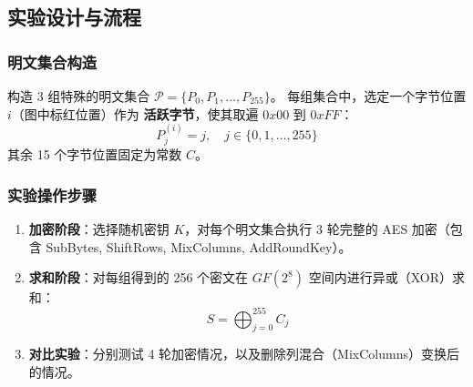 \subsection{实验设计与流程}

\subsubsection{明文集合构造}
构造 3 组特殊的明文集合 $\mathcal{P} = \{P_0, P_1, \dots, P_{255}\}$。
每组集合中，选定一个字节位置 $i$（图中标红位置）作为 \textbf{活跃字节}，使其取遍 $0x00$ 到 $0xFF$：
\begin{equation}
P_j^{(i)} = j, \quad j \in \{0, 1, \dots, 255\}
\end{equation}
其余 15 个字节位置固定为常数 $C$。

\subsubsection{实验操作步骤}
\begin{enumerate}
    \item \textbf{加密阶段}：选择随机密钥 $K$，对每个明文集合执行 3 轮完整的 AES 加密（包含 SubBytes, ShiftRows, MixColumns, AddRoundKey）。
    \item \textbf{求和阶段}：对每组得到的 256 个密文在 $GF(2^8)$ 空间内进行异或（XOR）求和：
    \begin{equation}
    S = \bigoplus_{j=0}^{255} C_j
    \end{equation}
    \item \textbf{对比实验}：分别测试 4 轮加密情况，以及删除列混合（MixColumns）变换后的情况。
\end{enumerate}